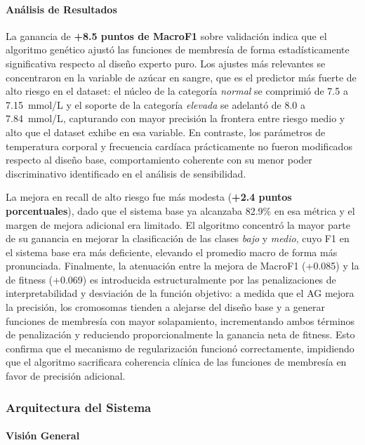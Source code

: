\documentclass[11pt]{article}
\begin{document}
\paragraph{An\'alisis de Resultados}

La ganancia de \textbf{+8.5 puntos de MacroF1} sobre validaci\'on indica que el algoritmo gen\'etico ajust\'o las funciones de membres\'ia de forma estad\'isticamente significativa respecto al dise\~no experto puro. Los ajustes m\'as relevantes se concentraron en la variable de az\'ucar en sangre, que es el predictor m\'as fuerte de alto riesgo en el dataset: el n\'ucleo de la categor\'ia \textit{normal} se comprimi\'o de 7.5 a 7.15~mmol/L y el soporte de la categor\'ia \textit{elevada} se adelant\'o de 8.0 a 7.84~mmol/L, capturando con mayor precisi\'on la frontera entre riesgo medio y alto que el dataset exhibe en esa variable. En contraste, los par\'ametros de temperatura corporal y frecuencia card\'iaca pr\'acticamente no fueron modificados respecto al dise\~no base, comportamiento coherente con su menor poder discriminativo identificado en el an\'alisis de sensibilidad.

La mejora en recall de alto riesgo fue m\'as modesta (\textbf{+2.4 puntos porcentuales}), dado que el sistema base ya alcanzaba 82.9\% en esa m\'etrica y el margen de mejora adicional era limitado. El algoritmo concentr\'o la mayor parte de su ganancia en mejorar la clasificaci\'on de las clases \textit{bajo} y \textit{medio}, cuyo F1 en el sistema base era m\'as deficiente, elevando el promedio macro de forma m\'as pronunciada. Finalmente, la atenuaci\'on entre la mejora de MacroF1 (+0.085) y la de fitness (+0.069) es introducida estructuralmente por las penalizaciones de interpretabilidad y desviaci\'on de la funci\'on objetivo: a medida que el AG mejora la precisi\'on, los cromosomas tienden a alejarse del dise\~no base y a generar funciones de membres\'ia con mayor solapamiento, incrementando ambos t\'erminos de penalizaci\'on y reduciendo proporcionalmente la ganancia neta de fitness. Esto confirma que el mecanismo de regularizaci\'on funcion\'o correctamente, impidiendo que el algoritmo sacrificara coherencia cl\'inica de las funciones de membres\'ia en favor de precisi\'on adicional.

\subsubsection{Arquitectura del Sistema}

\paragraph{Visión General}
\end{document}
